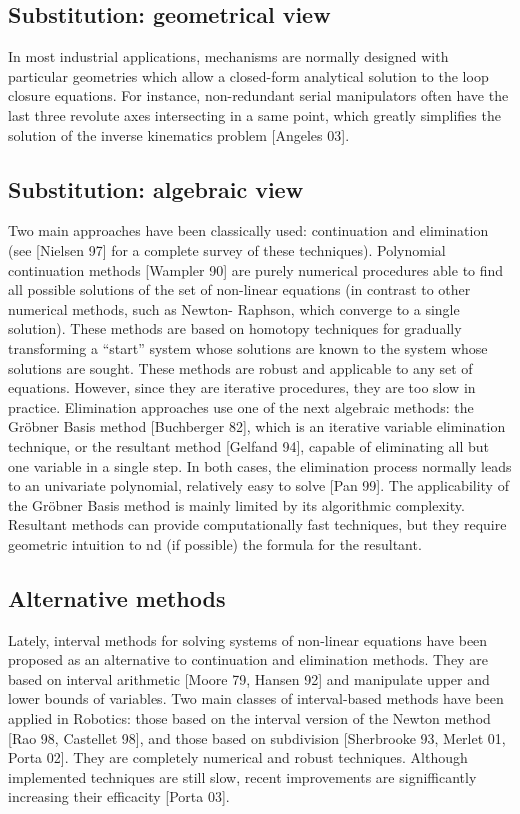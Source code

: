 \documentclass{book}
\begin{document}
\subsection{Substitution: geometrical view}

In most industrial applications, mechanisms are normally designed with
particular geometries which allow a closed-form analytical solution to the loop closure
equations. For instance, non-redundant serial manipulators often have the last three
revolute axes intersecting in a same point, which greatly simplifies the solution of the
inverse kinematics problem [Angeles 03].

\subsection{Substitution: algebraic view}

Two main approaches have been classically used: continuation and elimination (see [Nielsen 97] for a complete survey of these techniques). Polynomial continuation methods [Wampler 90] are purely numerical procedures able to find all possible solutions of the set of non-linear equations (in contrast to other numerical methods, such as Newton- Raphson, which converge to a single solution). These methods are based on homotopy techniques for gradually transforming a ``start'' system whose solutions are known to the system whose solutions are sought. These methods are robust and applicable to any set of equations. However, since they are iterative procedures, they are too slow in practice. Elimination approaches use one of the next algebraic methods: the Gr\"obner Basis method [Buchberger 82], which is an iterative variable elimination technique, or the resultant method [Gelfand 94], capable of eliminating all but one variable in a single step. In both cases, the elimination process normally leads to an univariate polynomial, relatively easy to solve [Pan 99]. The applicability of the Gr\"obner Basis method is mainly limited by its algorithmic complexity. Resultant methods can provide computationally fast techniques, but they require geometric intuition to nd (if possible) the formula for the resultant.

\subsection{Alternative methods}

Lately, interval methods for solving systems of non-linear equations have been proposed
as an alternative to continuation and elimination methods. They are based on interval
arithmetic [Moore 79, Hansen 92] and manipulate upper and lower bounds of variables.
Two main classes of interval-based methods have been applied in Robotics: those based
on the interval version of the Newton method [Rao 98, Castellet 98], and those based
on subdivision [Sherbrooke 93, Merlet 01, Porta 02]. They are completely numerical and
robust techniques. Although implemented techniques are still slow, recent improvements
are signifficantly increasing their efficacity [Porta 03].
\end{document}
